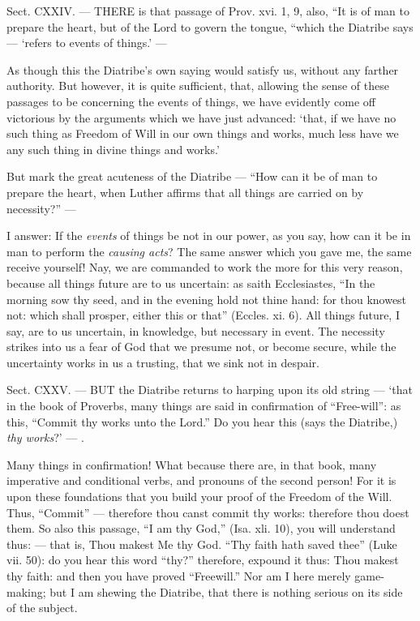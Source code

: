 
Sect. CXXIV. — THERE is that passage of Prov. xvi. 1, 9, also, “It is of man to prepare the heart, but of the Lord to govern the tongue, “which the Diatribe says — ‘refers to events of things.’ —

As though this the Diatribe’s own saying would satisfy us, without any farther authority. But however, it is quite sufficient, that, allowing the sense of these passages to be concerning the events of things, we have evidently come off victorious by the arguments which we have just advanced: ‘that, if we have no such thing as Freedom of Will in our own things and works, much less have we any such thing in divine things and works.’

But mark the great acuteness of the Diatribe — “How can it be of man to prepare the heart, when Luther affirms that all things are carried on by necessity?” —

I answer: If the \emph{events }of things be not in our power, as you say, how can it be in man to perform the \emph{causing acts}? The same answer which you gave me, the same receive yourself! Nay, we are commanded to work the more for this very reason, because all things future are to us uncertain: as saith Ecclesiastes, “In the morning sow thy seed, and in the evening hold not thine hand: for thou knowest not: which shall prosper, either this or that” (Eccles. xi. 6). All things future, I say, are to us uncertain, in knowledge, but necessary in event. The necessity strikes into us a fear of God that we presume not, or become secure, while the uncertainty works in us a trusting, that we sink not in despair.


Sect. CXXV. — BUT the Diatribe returns to harping upon its old string — ‘that in the book of Proverbs, many things are said in confirmation of “Free-will”: as this, “Commit thy works unto the Lord.” Do you hear this (says the Diatribe,) \emph{thy works}?’ — .

Many things in confirmation! What because there are, in that book, many imperative and conditional verbs, and pronouns of the second person! For it is upon these foundations that you build your proof of the Freedom of the Will. Thus, “Commit” — therefore thou canst commit thy works: therefore thou doest them. So also this passage, “I am thy God,” (Isa. xli. 10), you will understand thus: — that is, Thou makest Me thy God. “Thy faith hath saved thee” (Luke vii. 50): do you hear this word “thy?” therefore, expound it thus: Thou makest thy faith: and then you have proved “Freewill.” Nor am I here merely game-making; but I am shewing the Diatribe, that there is nothing serious on its side of the subject.

